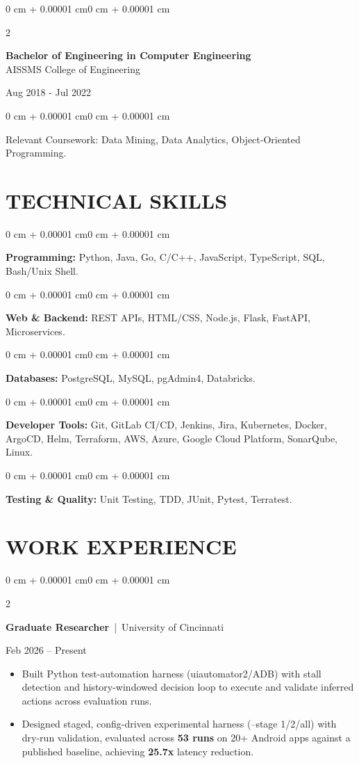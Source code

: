 \documentclass[10pt, letterpaper]{article}
\newenvironment{highlights}{
    \begin{itemize}[
        topsep=0.10 cm,
        parsep=0.06 cm,
        partopsep=0pt,
        itemsep=0.06 cm,
        leftmargin=12pt
    ]
}{
    \end{itemize}
}
\newenvironment{onecolentry}{
    \begin{adjustwidth}{0 cm + 0.00001 cm}{0 cm + 0.00001 cm}
}{
    \end{adjustwidth}
}
\newenvironment{twocolentry}[2][]{
    \onecolentry
    \def\secondColumn{#2}
    \setcolumnwidth{\fill, 4.5 cm}
    \begin{paracol}{2}
}{
    \switchcolumn \raggedleft \secondColumn
    \end{paracol}
    \endonecolentry
}
\begin{document}
\begin{twocolentry}{
    Aug 2018 - Jul 2022
}
    \textbf{Bachelor of Engineering in Computer Engineering} \\
    AISSMS College of Engineering
\end{twocolentry}
\begin{onecolentry}
Relevant Coursework: Data Mining, Data Analytics, Object-Oriented Programming.
\end{onecolentry}
\section{TECHNICAL SKILLS}
\begin{onecolentry}
\textbf{Programming:} Python, Java, Go, C/C++, JavaScript, TypeScript, SQL, Bash/Unix Shell.
\end{onecolentry}
\vspace{0.06 cm}
\begin{onecolentry}
\textbf{Web \& Backend:} REST APIs, HTML/CSS, Node.js, Flask, FastAPI, Microservices.
\end{onecolentry}
\vspace{0.06 cm}
\begin{onecolentry}
\textbf{Databases:} PostgreSQL, MySQL, pgAdmin4, Databricks.
\end{onecolentry}
\vspace{0.06 cm}
\begin{onecolentry}
\textbf{Developer Tools:} Git, GitLab CI/CD, Jenkins, Jira, Kubernetes, Docker, ArgoCD, Helm, Terraform, AWS, Azure, Google Cloud Platform, SonarQube, Linux.
\end{onecolentry}
\vspace{0.06 cm}
\begin{onecolentry}
\textbf{Testing \& Quality:} Unit Testing, TDD, JUnit, Pytest, Terratest.
\end{onecolentry}

\section{WORK EXPERIENCE}
\begin{twocolentry}{Feb 2026 -- Present}
\textbf{Graduate Researcher} \,|\, University of Cincinnati
\end{twocolentry}
\begin{highlights}
  \item Built Python test-automation harness (uiautomator2/ADB) with stall detection and history-windowed decision loop to execute and validate inferred actions across evaluation runs.
  \item Designed staged, config-driven experimental harness (--stage 1/2/all) with dry-run validation, evaluated across \textbf{53 runs} on 20+ Android apps against a published baseline, achieving \textbf{25.7x} latency reduction.
\end{highlights}
\end{document}
